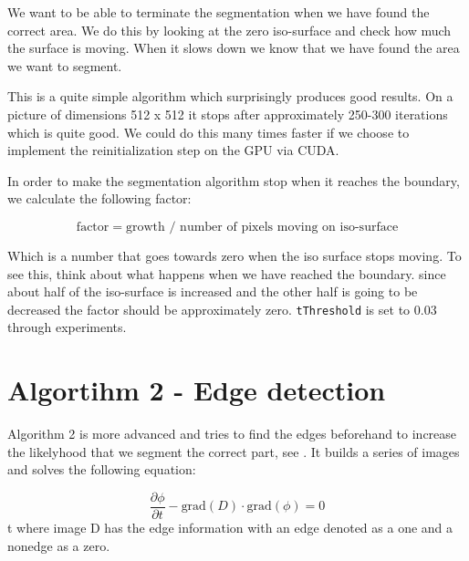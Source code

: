 We want to be able to terminate the segmentation when we have found
the correct area. We do this by looking at the zero iso-surface and
check how much the surface is moving. When it slows down we know that
we have found the area we want to segment.

This is a quite simple algorithm which surprisingly produces good
results. On a picture of dimensions 512 x 512 it stops after
approximately 250-300 iterations which is quite good. We could do this
many times faster if we choose to implement the reinitialization step
on the GPU via CUDA.

In order to make the segmentation algorithm stop when it reaches the
boundary, we calculate the following factor:

\begin{equation*}
 \textrm{factor} = \textrm{growth } / \textrm{ number of pixels moving on iso-surface}
\end{equation*}

Which is a number that goes towards zero when the iso surface stops
moving. To see this, think about what happens when we have reached the
boundary. since about half of the iso-surface is increased and the
other half is going to be decreased the factor should be approximately
zero. \texttt{tThreshold} is set to 0.03 through experiments.


\section{Algortihm 2 - Edge detection}
\label{segmentation:sec:algorithm2}


Algorithm 2 is more advanced and tries to find the edges beforehand to
increase the likelyhood that we segment the correct part, see
. It builds a series of images and solves the
following equation:

\begin{equation}
\label{segmentation:equation:advanced}
  \dfrac{\partial \phi}{\partial t} - \textrm{grad}(D) \cdot \textrm{grad}(\phi) = 0
\end{equation}
t
where image D has the edge information with an edge denoted as a one and a nonedge as a zero.

